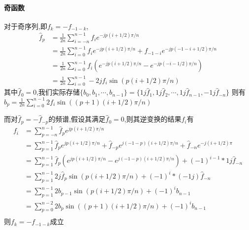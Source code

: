 \documentclass[UTF8]{ctexart}
\begin{document}
\paragraph{奇函数}
对于奇序列,即$f_{k}=-f_{-1-k}$,
\begin{equation*}
  \begin{split}
     \hat{f}_{p}    &= \frac{1}{2n}\sum\limits_{i=-n}^{n-1} f_{i} e^{-jp(i+1/2)\pi/n} \\
                    &= \frac{1}{2n}\sum\limits_{i=0}^{n-1} f_{i} e^{-jp(i+1/2)\pi/n}+f_{-1-i}e^{-jp(-1-i+1/2)\pi/n} \\
                    &= \frac{1}{2n}\sum\limits_{i=0}^{n-1} f_{i} (e^{-jp(i+1/2)\pi/n}-e^{-jp(-i-1/2)\pi/n}) \\
                    &= \frac{1}{2n}\sum\limits_{i=0}^{n-1} -2jf_{i} \sin(p(i+1/2)\pi/n)
  \end{split}
\end{equation*}
其中$\hat{f}_0=0$,我们实际存储$\{b_0,b_1,\cdots,b_{n-1}\} = \{1j\hat{f}_1,1j\hat{f}_2,\cdots,1j\hat{f}_{n-1},-1j\hat{f}_{-n}\}$
则有$b_p=\frac{1}{2n}\sum\limits_{i=0}^{n-1} 2f_{i} \sin((p+1)(i+1/2)\pi/n)$

而对$\hat{f}_p=-\hat{f}_{-p}$的频谱,假设其满足$\hat{f}_{0}=0$,则其逆变换的结果$f_i$有
\begin{equation*}
  \begin{split}
     f_{i}          &= \sum\limits_{p=-n}^{n-1} \hat{f}_{p} e^{jp(i+1/2)\pi/n} \\
                    &= \sum\limits_{p=1}^{n-1} \hat{f}_{p} e^{jp(i+1/2)\pi/n}+\hat{f}_{-p}e^{j(-1-p)(i+1/2)\pi/n} + \hat{f}_{-n}e^{-j(i+1/2)\pi}  \\
                    &= \sum\limits_{p=1}^{n-1} \hat{f}_{p} (e^{jp(i+1/2)\pi/n}-e^{j(-1-p)(i+1/2)\pi/n}) + (-1)^{i-1}*1j\hat{f}_{-n}\\
                    &= \sum\limits_{p=1}^{n-1} 2j\hat{f}_{p} \sin(p(i+1/2)\pi/n)+ (-1)^{i}*(-1j)\hat{f}_{-n} \\
                    &= \sum\limits_{p=1}^{n-1} 2b_{p-1} \sin(p(i+1/2)\pi/n)+  (-1)^{i}b_{n-1}\\
                    &= \sum\limits_{p=0}^{n-2} 2b_{p} \sin((p+1)(i+1/2)\pi/n)+  (-1)^{i}b_{n-1}\\
  \end{split}
\end{equation*}
则$f_{k}=-f_{-1-k}$成立
\end{document}
